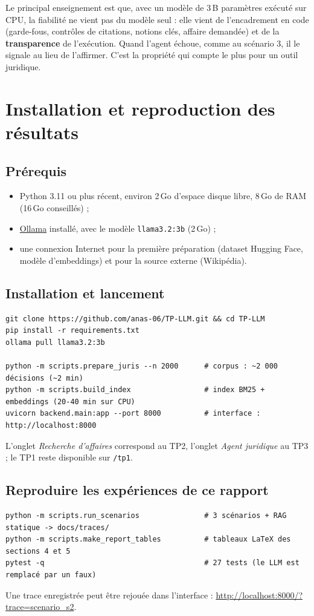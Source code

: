 \documentclass[11pt,a4paper]{article}
\begin{document}
Le principal enseignement est que, avec un modèle de 3\,B paramètres exécuté sur CPU, la fiabilité
ne vient pas du modèle seul : elle vient de l'encadrement en code (garde-fous, contrôles de
citations, notions clés, affaire demandée) et de la \textbf{transparence} de l'exécution. Quand
l'agent échoue, comme au scénario 3, il le signale au lieu de l'affirmer. C'est la propriété qui
compte le plus pour un outil juridique.

\clearpage
\appendix
\section{Installation et reproduction des résultats}

\subsection{Prérequis}
\begin{itemize}
  \item Python 3.11 ou plus récent, environ 2\,Go d'espace disque libre, 8\,Go de RAM (16\,Go conseillés) ;
  \item \href{https://ollama.com}{Ollama} installé, avec le modèle \texttt{llama3.2:3b} (2\,Go) ;
  \item une connexion Internet pour la première préparation (dataset Hugging Face, modèle d'embeddings) et pour la source externe (Wikipédia).
\end{itemize}

\subsection{Installation et lancement}
\begin{lstlisting}
git clone https://github.com/anas-06/TP-LLM.git && cd TP-LLM
pip install -r requirements.txt
ollama pull llama3.2:3b

python -m scripts.prepare_juris --n 2000      # corpus : ~2 000 décisions (~2 min)
python -m scripts.build_index                 # index BM25 + embeddings (20-40 min sur CPU)
uvicorn backend.main:app --port 8000          # interface : http://localhost:8000
\end{lstlisting}
L'onglet \emph{Recherche d'affaires} correspond au TP2, l'onglet \emph{Agent juridique} au TP3 ;
le TP1 reste disponible sur \texttt{/tp1}.

\subsection{Reproduire les expériences de ce rapport}
\begin{lstlisting}
python -m scripts.run_scenarios               # 3 scénarios + RAG statique -> docs/traces/
python -m scripts.make_report_tables          # tableaux LaTeX des sections 4 et 5
pytest -q                                     # 27 tests (le LLM est remplacé par un faux)
\end{lstlisting}
Une trace enregistrée peut être rejouée dans l'interface :
\url{http://localhost:8000/?trace=scenario_s2}.
\end{document}
